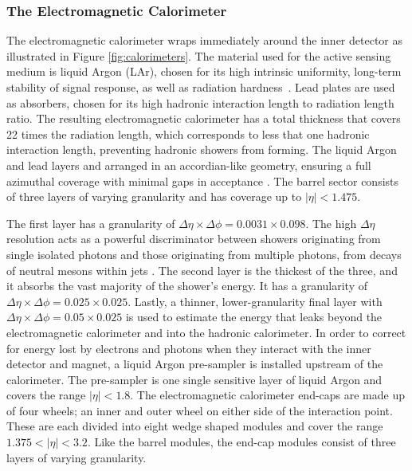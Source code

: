 \subsubsection{The Electromagnetic Calorimeter}
The electromagnetic calorimeter wraps immediately around the inner detector as illustrated in Figure \ref{fig:calorimeters}. The material used for the active sensing medium is liquid Argon (LAr), chosen for its high intrinsic uniformity, long-term stability of signal response, as well as radiation hardness~\cite{Zhang_2011}. Lead plates are used as absorbers, chosen for its high hadronic interaction length to radiation length ratio. The resulting electromagnetic calorimeter has a total thickness that covers 22 times the radiation length, which corresponds to less that one hadronic interaction length, preventing hadronic showers from forming. The liquid Argon and lead layers and arranged in an accordian-like geometry, ensuring a full azimuthal coverage with minimal gaps in acceptance . The barrel sector consists of three layers of varying granularity and has coverage up to $|\eta| < 1.475$. 

The first layer has a granularity of $\Delta\eta\times\Delta\phi=0.0031\times 0.098$. The high $\Delta\eta$ resolution acts as a powerful discriminator between showers originating from single isolated photons and those originating from multiple photons, from decays of neutral mesons within jets . The second layer is the thickest of the three, and it absorbs the vast majority of the shower's energy. It has a granularity of $\Delta\eta\times\Delta\phi=0.025\times 0.025$. Lastly, a thinner, lower-granularity final layer with $\Delta\eta\times\Delta\phi=0.05\times 0.025$ is used to estimate the energy that leaks beyond the electromagnetic calorimeter and into the hadronic calorimeter. In order to correct for energy lost by electrons and photons when they interact with the inner detector and magnet, a liquid Argon pre-sampler is installed upstream of the calorimeter. The pre-sampler is one single sensitive layer of liquid Argon and covers the range $|\eta| < 1.8$. The electromagnetic calorimeter end-caps are made up of four wheels; an inner and outer wheel on either side of the interaction point. These are each divided into eight wedge shaped modules and cover the range $1.375 < |\eta| < 3.2$. Like the barrel modules, the end-cap modules consist of three layers of varying granularity.

